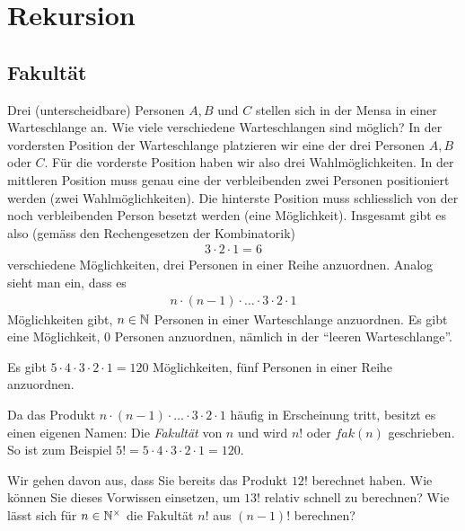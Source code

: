 \chapter{Rekursion}\label{ch:Kapitel03}

\section{Fakultät}\label{sec:fakultaet}
Drei (unterscheidbare) Personen $A, B$ und $C$ stellen sich in der Mensa in einer Warteschlange an. Wie viele verschiedene Warteschlangen sind möglich? In der vordersten Position der Warteschlange platzieren wir eine der drei Personen $A, B$ oder $C$. Für die vorderste Position haben wir also drei Wahlmöglichkeiten. In der mittleren Position muss genau eine der verbleibenden zwei Personen positioniert werden (zwei Wahlmöglichkeiten). Die hinterste Position muss schliesslich von der noch verbleibenden Person besetzt werden (eine Möglichkeit). Insgesamt gibt es also (gemäss den Rechengesetzen der Kombinatorik)
\begin{align*}
    3\cdot 2\cdot 1 = 6
\end{align*}
verschiedene Möglichkeiten, drei Personen in einer Reihe anzuordnen. Analog sieht man ein, dass es
\begin{align*}
    n\cdot (n-1)\cdot\ldots\cdot 3\cdot 2\cdot 1
\end{align*}
Möglichkeiten gibt, $n\in\mathbb{N}$ Personen in einer Warteschlange anzuordnen. Es gibt eine Möglichkeit, $0$ Personen anzuordnen, nämlich in der \enquote{leeren Warteschlange}.
\begin{myexample}
Es gibt $5\cdot 4\cdot 3\cdot 2\cdot 1 = 120$ Möglichkeiten, fünf Personen in einer Reihe anzuordnen.
\end{myexample}

Da das Produkt $n\cdot (n-1)\cdot\ldots\cdot 3\cdot 2\cdot 1$ häufig in Erscheinung tritt, besitzt es einen eigenen Namen: Die \textit{Fakultät} von $n$ und wird $n!$ oder $fak(n)$ geschrieben. So ist zum Beispiel $5! = 5\cdot 4\cdot 3\cdot 2\cdot 1 = 120$.

\begin{myexercise}\label{myexercise:0301}
Wir gehen davon aus, dass Sie bereits das Produkt $12!$  berechnet haben. Wie können Sie dieses Vorwissen einsetzen, um $13!$ relativ schnell zu berechnen? Wie lässt sich für $n\in\mathbb{N}^{\times}$ die Fakultät $n!$ aus $(n-1)!$ berechnen?
\end{myexercise}

